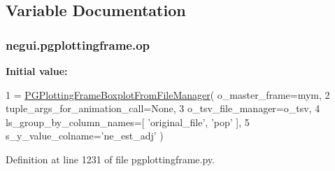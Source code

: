 \subsection{Variable Documentation}
\subsubsection[{\texorpdfstring{op}{op}}]{\setlength{\rightskip}{0pt plus 5cm}negui.\+pgplottingframe.\+op}\hypertarget{namespacenegui_1_1pgplottingframe_a59e1cd5cf3cdfbfc16b871e80989a095}{}\label{namespacenegui_1_1pgplottingframe_a59e1cd5cf3cdfbfc16b871e80989a095}
{\bfseries Initial value\+:}
\begin{DoxyCode}
1 = \hyperlink{classnegui_1_1pgplottingframe_1_1PGPlottingFrameBoxplotFromFileManager}{PGPlottingFrameBoxplotFromFileManager}( o\_master\_frame=mym,
2                                     tuple\_args\_for\_animation\_call=\textcolor{keywordtype}{None},
3                                     o\_tsv\_file\_manager=o\_tsv,
4                                     ls\_group\_by\_column\_names=[ \textcolor{stringliteral}{'original\_file'}, \textcolor{stringliteral}{'pop'} ],
5                                     s\_y\_value\_colname=\textcolor{stringliteral}{'ne\_est\_adj'} )
\end{DoxyCode}


Definition at line 1231 of file pgplottingframe.\+py.


